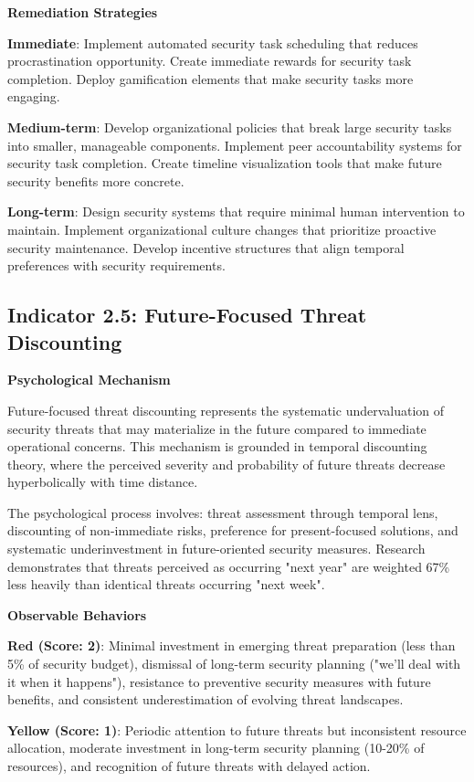 \documentclass[11pt,a4paper]{article}
\begin{document}
\textbf{Remediation Strategies}

\textbf{Immediate}: Implement automated security task scheduling that reduces procrastination opportunity. Create immediate rewards for security task completion. Deploy gamification elements that make security tasks more engaging.

\textbf{Medium-term}: Develop organizational policies that break large security tasks into smaller, manageable components. Implement peer accountability systems for security task completion. Create timeline visualization tools that make future security benefits more concrete.

\textbf{Long-term}: Design security systems that require minimal human intervention to maintain. Implement organizational culture changes that prioritize proactive security maintenance. Develop incentive structures that align temporal preferences with security requirements.

\subsection{Indicator 2.5: Future-Focused Threat Discounting}

\textbf{Psychological Mechanism}

Future-focused threat discounting represents the systematic undervaluation of security threats that may materialize in the future compared to immediate operational concerns. This mechanism is grounded in temporal discounting theory, where the perceived severity and probability of future threats decrease hyperbolically with time distance.

The psychological process involves: threat assessment through temporal lens, discounting of non-immediate risks, preference for present-focused solutions, and systematic underinvestment in future-oriented security measures. Research demonstrates that threats perceived as occurring "next year" are weighted 67\% less heavily than identical threats occurring "next week".

\textbf{Observable Behaviors}

\textbf{Red (Score: 2)}: Minimal investment in emerging threat preparation (less than 5\% of security budget), dismissal of long-term security planning ("we'll deal with it when it happens"), resistance to preventive security measures with future benefits, and consistent underestimation of evolving threat landscapes.

\textbf{Yellow (Score: 1)}: Periodic attention to future threats but inconsistent resource allocation, moderate investment in long-term security planning (10-20\% of resources), and recognition of future threats with delayed action.
\end{document}
